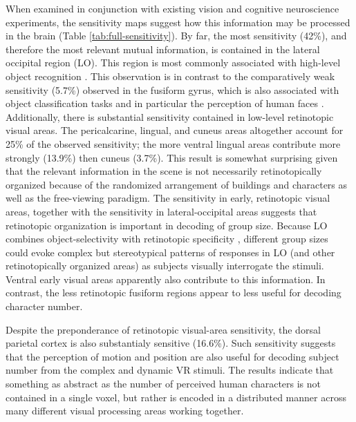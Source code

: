 \documentclass[review,1p,authoryear]{elsarticle}
\begin{document}
When examined in conjunction with existing vision and cognitive neuroscience experiments, the sensitivity maps suggest how this information may be processed in the brain (Table \ref{tab:full-sensitivity}).
By far, the most sensitivity (42\%), and therefore the most relevant mutual information, is contained in the lateral occipital region (LO).
This region is most commonly associated with high-level object recognition \citep{Grill-Spector2001}.
This observation is in contrast to the comparatively weak sensitivity (5.7\%) observed in the fusiform gyrus, which is also associated with object classification tasks and in particular the perception of human faces \citep{Kanwisher1997}.
Additionally, there is substantial sensitivity contained in low-level retinotopic visual areas. 
The pericalcarine, lingual, and cuneus areas altogether account for 25\% of the observed sensitivity; the more ventral lingual areas contribute more strongly (13.9\%) then cuneus (3.7\%).
This result is somewhat surprising given that the relevant information in the scene is not necessarily retinotopically organized because of the randomized arrangement of buildings and characters as well as the free-viewing paradigm.
The sensitivity in early, retinotopic visual areas, together with the sensitivity in lateral-occipital areas suggests that retinotopic organization is important in decoding of group size. 
Because LO combines object-selectivity with retinotopic specificity \citep{Sayres2008}, different group sizes could evoke complex but stereotypical patterns of responses in LO (and other retinotopically organized areas) as subjects visually interrogate the stimuli. 
Ventral early visual areas apparently also contribute to this information. 
In contrast, the less retinotopic fusiform regions \citep{Schwarzlose2008,Sayres2010} appear to less useful for decoding character number.

Despite the preponderance of retinotopic visual-area sensitivity, the dorsal parietal cortex is also substantialy sensitive (16.6\%). 
Such sensitivity suggests that the perception of motion and position are also useful for decoding subject number from the complex and dynamic VR stimuli.
The results indicate that something as abstract as the number of perceived human characters is not contained in a single voxel, but rather is encoded in a distributed manner across many different visual processing areas working together.
\end{document}
